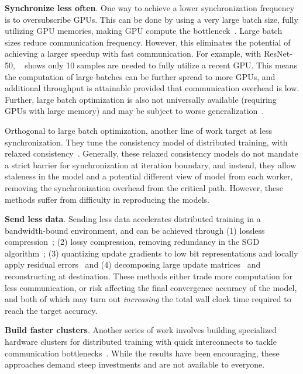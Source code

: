 \noindent\textbf{Synchronize less often}. One way to achieve a lower synchronization frequency is to oversubscribe GPUs. This can be done by using a very large batch size, fully utilizing GPU memories, making GPU compute the bottleneck~\cite{Nowanyon13:online, ImageNetIn1Hour, sridharan2018scaleout, jia2018highly, you2019large,you2017large}. Large batch sizes reduce communication frequency. However, this eliminates the potential of achieving a larger speedup with fast communication. For example, with ResNet-50, ~\cite{Shen2018NexusA} shows only 10 samples are needed to fully utilize a recent GPU. This means the computation of large batches can be further spread to more GPUs, and additional throughput is attainable provided that communication overhead is low. Further, large batch optimization is also not universally available (requiring GPUs with large memory) and may be subject to worse generalization~\cite{keskar2016large}.

Orthogonal to large batch optimization, another line of work target at less synchronization. They tune the consistency model of distributed training, with relaxed consistency~\cite{DBLP:journals/corr/DaiKWHGX14,SSP,BSP,Wei:2015:MCC:2806777.2806778,Litz,xie2018orpheus,wang2018adaptive}. Generally, these relaxed consistency models do not mandate a strict barrier for synchronization at iteration boundary, and instead, they allow staleness in the model and a potential different view of model from each worker, removing the synchronization overhead from the critical path. However, these methods suffer from difficulty in reproducing the models. 

\noindent\textbf{Send less data}. Sending less data accelerates distributed training in a bandwidth-bound environment, and can be achieved through (1) lossless compression~\cite{burtscher2009fpc}; (2) lossy compression, removing redundancy in the SGD algorithm~\cite{lin2017deep}; (3) quantizing update gradients to low bit representations and locally apply residual errors~\cite{cntk1bt, lim20183lc} and (4) decomposing large update matrices~\cite{projectAdam,poseidon,xie2015distributed} and reconstructing at destination. These methods either trade more computation for less communication, or risk affecting the final convergence accuracy of the model, and both of which may turn out \textit{increasing} the total wall clock time required to reach the target accuracy.

\noindent\textbf{Build faster clusters}. Another series of work involves building specialized hardware clusters for distributed training with quick interconnects to tackle communication bottlenecks~\cite{DBLP:journals/corr/abs-1711-00489, You:2018:ITM:3225058.3225069, DBLP:journals/corr/abs-1711-04325,jia2018highly,DBLP:journals/corr/abs-1811-05233,sun2019optimizing, ImageNetIn1Hour, firecaffe}. While the results have been encouraging, these approaches demand steep investments and are not available to everyone.

